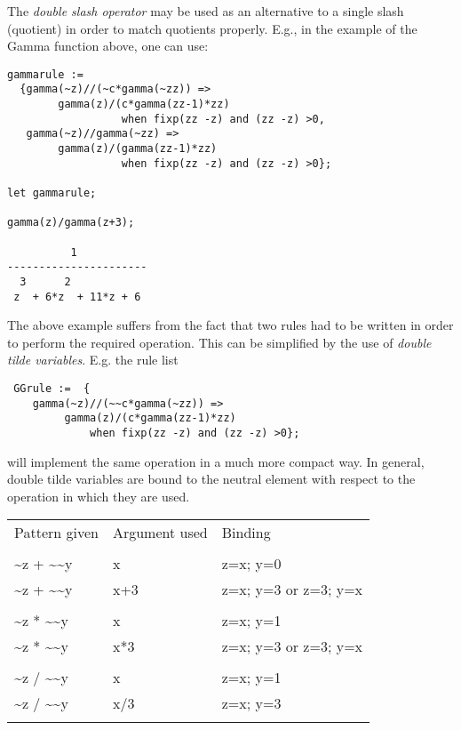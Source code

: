 \hypertarget{reserved:doubleslashop}{}
The \emph{double slash operator} may be used as an alternative to a single
slash (quotient) in order to match quotients properly.  E.g., in the
example of the Gamma function above, one can use:
\begin{verbatim}
gammarule :=
  {gamma(~z)//(~c*gamma(~zz)) =>
        gamma(z)/(c*gamma(zz-1)*zz)
                  when fixp(zz -z) and (zz -z) >0,
   gamma(~z)//gamma(~zz) =>
        gamma(z)/(gamma(zz-1)*zz)
                  when fixp(zz -z) and (zz -z) >0};

let gammarule;

gamma(z)/gamma(z+3);

          1
----------------------
  3      2
 z  + 6*z  + 11*z + 6
\end{verbatim}
The above example suffers from the fact that two rules had to be
written in order to perform the required operation. This can be simplified
by the use of \emph{double tilde variables}. E.g. the rule list
\begin{verbatim}
 GGrule :=  {
    gamma(~z)//(~~c*gamma(~zz)) =>
         gamma(z)/(c*gamma(zz-1)*zz)
             when fixp(zz -z) and (zz -z) >0};
\end{verbatim}
will implement the same operation in a much more compact way.
In general, double tilde variables are bound to the neutral element
with respect to the operation in which they are used.

\begin{tabular}{lll}

Pattern given & Argument used & Binding  \\
\\
\textasciitilde z + \textasciitilde \textasciitilde y  &   x   &  z=x; y=0  \\
\textasciitilde z + \textasciitilde \textasciitilde y  &   x+3 &  z=x; y=3  or  z=3; y=x \\
\\
\textasciitilde z * \textasciitilde \textasciitilde y  &   x   &  z=x; y=1\\
\textasciitilde z * \textasciitilde \textasciitilde y  &   x*3 &  z=x; y=3  or  z=3; y=x\\
\\
\textasciitilde z / \textasciitilde \textasciitilde y  &    x   &  z=x; y=1\\
\textasciitilde z / \textasciitilde \textasciitilde y  &    x/3 &  z=x; y=3  \\
\\
\end{tabular}

